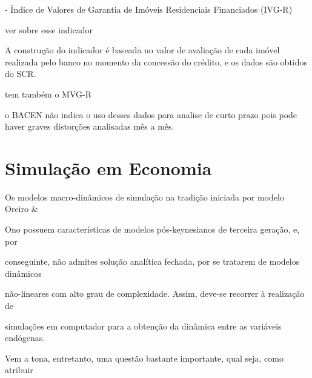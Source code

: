 


- Índice de Valores de Garantia de Imóveis Residenciais Financiados (IVG-R)

ver sobre esse indicador
	
A construção do indicador é baseada no valor de avaliação de cada imóvel realizada pelo banco no momento da concessão do crédito, e os dados são obtidos do SCR.

tem também o MVG-R

o BACEN não indica o uso desses dados para analise de curto prazo pois pode haver graves distorções analisadas mês a mês.




\section{Simulação em Economia}



Os modelos macro-dinâmicos de simulação na tradição iniciada por modelo Oreiro \&

Ono possuem características de modelos pós-keynesianos de terceira geração, e, por

conseguinte, não admites solução analítica fechada, por se tratarem de modelos dinâmicos

não-lineares com alto grau de complexidade. Assim, deve-se recorrer à realização de

simulações em computador para a obtenção da dinâmica entre as variáveis endógenas.


Vem a tona, entretanto, uma questão bastante importante, qual seja, como atribuir


